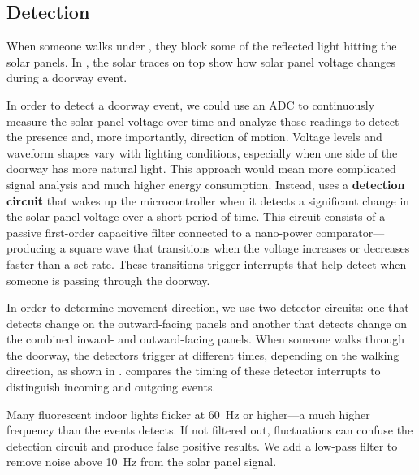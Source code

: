 \subsection{Detection}
\label{sec:detection}




When someone walks under \sysname, they block some of the reflected light hitting the solar panels.
In , the solar traces on top show how solar panel voltage changes during a doorway event.

In order to detect a doorway event, we could use an ADC to continuously measure the solar panel voltage over time and analyze those readings to detect the presence and, more importantly, direction of motion.
Voltage levels and waveform shapes vary with lighting conditions, especially when one side of the doorway has more natural light.
This approach would mean more complicated signal analysis and much higher energy consumption.
Instead, \sysname uses a \textbf{detection circuit} that wakes up the microcontroller when it detects a significant change in the solar panel voltage over a short period of time.
This circuit consists of a passive first-order capacitive filter connected to a nano-power comparator---producing a square wave that transitions when the voltage increases or decreases faster than a set rate.
These transitions trigger interrupts that help \sysname detect when someone is passing through the doorway.

In order to determine movement direction, we use two detector circuits: one that detects change on the outward-facing panels and another that detects change on the combined inward- and outward-facing panels.
When someone walks through the doorway, the detectors trigger at different times, depending on the walking direction, as shown in .
\sysname compares the timing of these detector interrupts to distinguish incoming and outgoing events.


Many fluorescent indoor lights flicker at \SI{60}{\hertz} or higher---a much higher frequency than the events \sysname detects.
If not filtered out, fluctuations can confuse the detection circuit and produce false positive results.
We add a low-pass filter to remove noise above \SI{10}{\hertz} from the solar panel signal.

